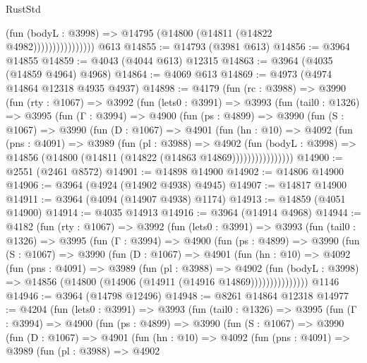 \begin{lexlean}{RustStd}
\begin{coremodule}
{\begin{coremodule}
{{{{{{{{{{{{{{{{{{{{{{{{{{{{{{{{{{{{{{                            (fun (bodyL : @3998) =>
                            @14795 (@14800 (@14811 (@14822 @4982))))))))))))))))
    @613
@14855 := @14793 (@3981 @613)
@14856 := @3964 @14855
@14859 := @4043 (@4044 @613) @12315
@14863 := @3964 (@4035 (@14859 @4964) @4968)
@14864 := @4069 @613
@14869 := @4973 (@4974 @14864 @12318 @4935 @4937)
@14898 := @4179
    (fun (rc : @3988) =>
    @3990
      (fun (rty : @1067) =>
      @3992
        (fun (lets0 : @3991) =>
        @3993
          (fun (tail0 : @1326) =>
          @3995
            (fun (Γ : @3994) =>
            @4900
              (fun (ps : @4899) =>
              @3990
                (fun (S : @1067) =>
                @3990
                  (fun (D : @1067) =>
                  @4901
                    (fun (hn : @10) =>
                    @4092
                      (fun (pns : @4091) =>
                      @3989
                        (fun (pl : @3988) =>
                        @4902
                          (fun (bodyL : @3998) =>
                          @14856 (@14800 (@14811 (@14822 (@14863 @14869))))))))))))))))
@14900 := @2551 (@2461 @8572)
@14901 := @14898 @14900
@14902 := @14806 @14900
@14906 := @3964 (@4924 (@14902 @4938) @4945)
@14907 := @14817 @14900
@14911 := @3964 (@4094 (@14907 @4938) @1174)
@14913 := @14859 (@4051 @14900)
@14914 := @4035 @14913
@14916 := @3964 (@14914 @4968)
@14944 := @4182
    (fun (rty : @1067) =>
    @3992
      (fun (lets0 : @3991) =>
      @3993
        (fun (tail0 : @1326) =>
        @3995
          (fun (Γ : @3994) =>
          @4900
            (fun (ps : @4899) =>
            @3990
              (fun (S : @1067) =>
              @3990
                (fun (D : @1067) =>
                @4901
                  (fun (hn : @10) =>
                  @4092
                    (fun (pns : @4091) =>
                    @3989
                      (fun (pl : @3988) =>
                      @4902
                        (fun (bodyL : @3998) =>
                        @14856 (@14800 (@14906 (@14911 (@14916 @14869)))))))))))))))
    @1146
@14946 := @3964 (@14798 @12496)
@14948 := @8261 @14864 @12318
@14977 := @4204
    (fun (lets0 : @3991) =>
    @3993
      (fun (tail0 : @1326) =>
      @3995
        (fun (Γ : @3994) =>
        @4900
          (fun (ps : @4899) =>
          @3990
            (fun (S : @1067) =>
            @3990
              (fun (D : @1067) =>
              @4901
                (fun (hn : @10) =>
                @4092
                  (fun (pns : @4091) =>
                  @3989
                    (fun (pl : @3988) =>
                    @4902
}}}}}}}}}}}}}}}}}}}}}}}}}}}}}}}}}}}}}}
\end{coremodule}}
\end{coremodule}
\end{lexlean}
